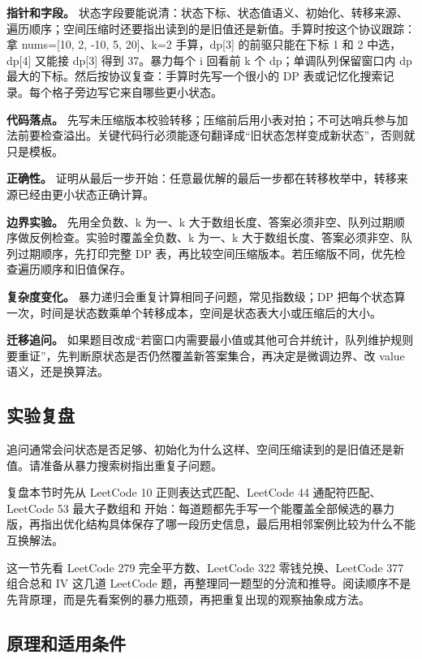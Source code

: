 \textbf{指针和字段。} 状态字段要能说清：状态下标、状态值语义、初始化、转移来源、遍历顺序；空间压缩时还要指出读到的是旧值还是新值。手算时按这个协议跟踪：拿 nums=[10, 2, -10, 5, 20]、k=2 手算，dp[3] 的前驱只能在下标 1 和 2 中选，dp[4] 又能接 dp[3] 得到 37。暴力每个 i 回看前 k 个 dp；单调队列保留窗口内 dp 最大的下标。然后按协议复查：手算时先写一个很小的 DP 表或记忆化搜索记录。每个格子旁边写它来自哪些更小状态。

\textbf{代码落点。} 先写未压缩版本校验转移；压缩前后用小表对拍；不可达哨兵参与加法前要检查溢出。关键代码行必须能逐句翻译成“旧状态怎样变成新状态”，否则就只是模板。

\textbf{正确性。} 证明从最后一步开始：任意最优解的最后一步都在转移枚举中，转移来源已经由更小状态正确计算。

\textbf{边界实验。} 先用全负数、k 为一、k 大于数组长度、答案必须非空、队列过期顺序做反例检查。实验时覆盖全负数、k 为一、k 大于数组长度、答案必须非空、队列过期顺序，先打印完整 DP 表，再比较空间压缩版本。若压缩版不同，优先检查遍历顺序和旧值保存。

\textbf{复杂度变化。} 暴力递归会重复计算相同子问题，常见指数级；DP 把每个状态算一次，时间是状态数乘单个转移成本，空间是状态表大小或压缩后的大小。

\textbf{迁移追问。} 如果题目改成“若窗口内需要最小值或其他可合并统计，队列维护规则要重证”，先判断原状态是否仍然覆盖新答案集合，再决定是微调边界、改 value 语义，还是换算法。

\subsection{实验复盘}

追问通常会问状态是否足够、初始化为什么这样、空间压缩读到的是旧值还是新值。请准备从暴力搜索树指出重复子问题。

复盘本节时先从 LeetCode 10 正则表达式匹配、LeetCode 44 通配符匹配、LeetCode 53 最大子数组和 开始：每道题都先手写一个能覆盖全部候选的暴力版，再指出优化结构具体保存了哪一段历史信息，最后用相邻案例比较为什么不能互换解法。

这一节先看 LeetCode 279 完全平方数、LeetCode 322 零钱兑换、LeetCode 377 组合总和 IV 这几道 LeetCode 题，再整理同一题型的分流和推导。阅读顺序不是先背原理，而是先看案例的暴力瓶颈，再把重复出现的观察抽象成方法。

\subsection{原理和适用条件}

